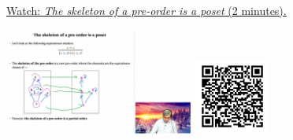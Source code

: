 
\begin{minipage}{10cm}
    \href{https://act4e-spring21.netlify.app/videos/spring2021-tradeoffs:tradeoffs:orders:preorder-poset.html}{Watch: \emph{The skeleton of a pre-order is a poset} (2 minutes).}
        
    \href{https://act4e-spring21.netlify.app/videos/spring2021-tradeoffs:tradeoffs:orders:preorder-poset.html}{\includegraphics[height=3.5cm]{spring2021-tradeoffs:tradeoffs:orders:preorder-poset/thumbnails.jpg}}
    \href{https://act4e-spring21.netlify.app/videos/spring2021-tradeoffs:tradeoffs:orders:preorder-poset.html}{\includegraphics[height=2.5cm]{spring2021-tradeoffs:tradeoffs:orders:preorder-poset/qrcode.png}}
\end{minipage}

